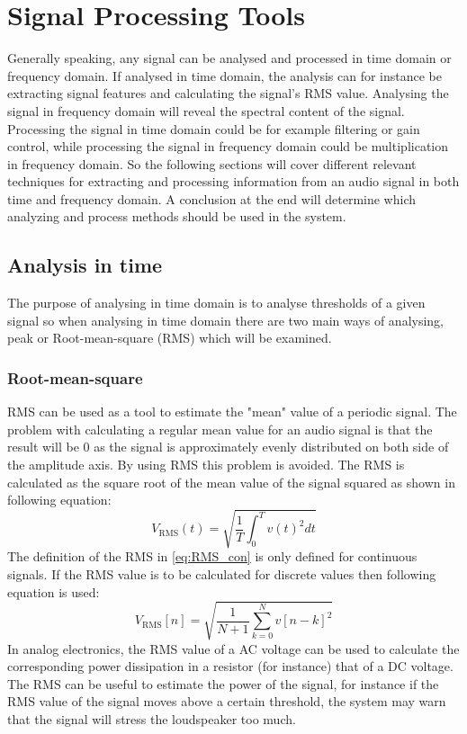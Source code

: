 \chapter{Signal Processing Tools}
Generally speaking, any signal can be analysed and processed in time domain or frequency domain. If analysed in time domain, the analysis can for instance be extracting signal features and calculating the signal's RMS value. Analysing the signal in frequency domain will reveal the spectral content of the signal. Processing the signal in time domain could be for example filtering or gain control, while processing the signal in frequency domain could be multiplication in frequency domain. So the following sections will cover different relevant techniques for extracting and processing information from an audio signal in both time and frequency domain. A conclusion at the end will determine which analyzing and process methods should be used in the system.

\section{Analysis in time} \label{sec:SignalTime}
The purpose of analysing in time domain is to analyse thresholds of a given signal so when analysing in time domain there are two main ways of analysing, peak or Root-mean-square (RMS) which will be examined.
\subsection*{Root-mean-square}
RMS can be used as a tool to estimate the "mean" value of a periodic signal. The problem with calculating a regular mean value for an audio signal is that the result will be 0 as the signal is approximately evenly distributed on both side of the amplitude axis. By using RMS this problem is avoided. The RMS is calculated as the square root of the mean value of the signal squared as shown in following equation:
\begin{equation}\label{eq:RMS_con}
V_{\text{RMS}}(t) = \sqrt{\frac{1}{T}\int_0^T v(t)^2 dt}
\end{equation}
The definition of the RMS in \autoref{eq:RMS_con} is only defined for continuous signals. If the RMS value is to be calculated for discrete values then following equation is used:
\begin{equation}
V_{\text{RMS}}[n] = \sqrt{\frac{1}{N+1}\sum_{k=0}^{N} v[n-k]^2}
\end{equation}
In analog electronics, the RMS value of a AC voltage can be used to calculate the corresponding power dissipation in a resistor (for instance) that of a DC voltage. The RMS can be useful to estimate the power of the signal, for instance if the RMS value of the signal moves above a certain threshold, the system may warn that the signal will stress the loudspeaker too much.

